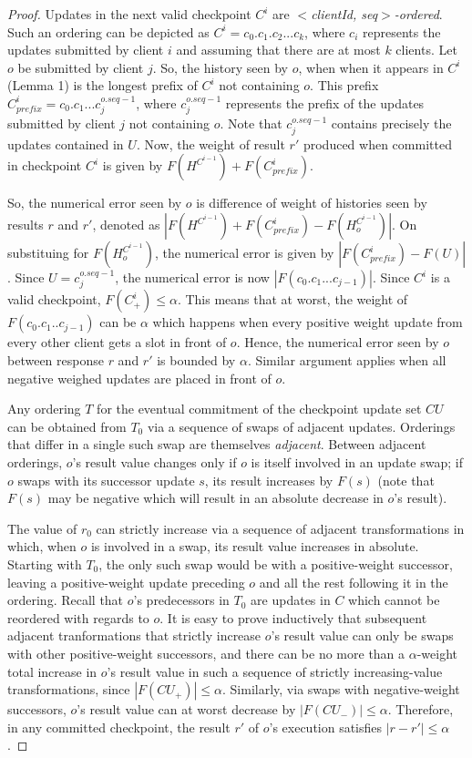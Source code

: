 \documentclass[twocolumn,10pt]{article}
\begin{document}
{\begin{proof}
Updates in the next valid checkpoint $C^i$ are \emph{$<$clientId, seq$>$-ordered}. Such an ordering
can be depicted as $C^i = c_0.c_1.c_2...c_k$, where $c_i$ represents the updates
submitted by client $i$ and assuming that there are at most $k$ clients.
Let $o$ be submitted by client $j$. So, the history seen by $o$, when 
when it appears in $C^i$ (Lemma 1) 
is the longest prefix of $C^i$ not containing $o$. This prefix $C^i_{prefix} =
c_0.c_1...c_j^{o.seq-1}$, where $c_j^{o.seq-1}$ represents the prefix of the updates submitted
by client $j$ not containing $o$. Note that $c_j^{o.seq-1}$ contains precisely the updates contained in $U$. Now,
the weight of result $r'$ produced when committed in checkpoint $C^i$ is given by $F(H^{C^{i-1}})+F(C^i_{prefix})$.

So, the numerical error seen by $o$ is difference of weight of histories seen by results $r$ and $r'$, denoted as
$|F(H^{C^{i-1}}) + F(C^i_{prefix}) - F(H_o^{C^{i-1}})|$.
On substituing for $F(H_o^{C^{i-1}})$, 
the numerical error is given by $|F(C^i_{prefix}) - F(U)|$. Since $U=c_j^{o.seq-1}$, 
the numerical error is now $|F(c_0.c_1...c_{j-1})|$. Since $C^i$ is a valid checkpoint, $F(C^i_+) \leq \alpha$.
This means that at worst, the weight of $F(c_0.c_1..c_{j-1})$ can be $\alpha$ which happens when 
every positive weight update from every other client gets a slot in front of $o$. Hence, the numerical
error seen by $o$ between response $r$ and $r'$ is bounded by $\alpha$. Similar argument applies when
all negative weighed updates are placed in front of $o$. 


Any ordering $T$ for the eventual commitment of the checkpoint update
set $CU$ can be obtained from $T_0$ via a sequence of swaps of adjacent
updates.  Orderings that differ in a single such swap are themselves
\emph{adjacent}. Between adjacent orderings, $o$'s result value changes
only if $o$ is itself involved in an update swap; if $o$ swaps with its
successor update $s$, its result increases by $F(s)$ (note that $F(s)$
may be negative which will result in an absolute decrease in $o$'s
result). 

The value of $r_0$ can strictly increase via a sequence of
adjacent transformations in which, when $o$ is involved in a swap, its result
value increases in absolute. Starting with $T_0$, the only such swap
would be with a positive-weight successor, leaving a positive-weight
update preceding $o$ and all the rest following it in the
ordering. Recall that $o$'s predecessors in $T_0$ are updates in $C$
which cannot be reordered with regards to $o$. It
is easy to prove inductively that subsequent adjacent tranformations that strictly
increase $o$'s result value can only be swaps with other positive-weight
successors, and there can be no more than a $\alpha$-weight total increase in
$o$'s result value in such a sequence of strictly increasing-value
transformations, since $|F(CU_+)| \leq \alpha$. Similarly, via swaps with
negative-weight successors, $o$'s result value can at worst decrease by
$|F(CU_-)| \leq \alpha$.  Therefore, in any committed checkpoint, the result $r'$ of
$o$'s execution satisfies $|r-r'| \leq \alpha$.
\fi
\end{proof}




}
\end{document}
